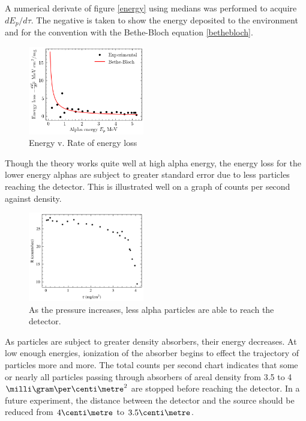 \documentclass[12pt]{article}
\begin{document}
\begin{multicols}{2}
    A numerical derivate of figure \ref{energy} using medians was performed to acquire $dE_p/d\tau$. The negative is taken to show the energy deposited to the environment and for the convention with the Bethe-Bloch equation \ref{bethebloch}. 

    \begin{figure}[H]
        \includegraphics[width=0.45\textwidth]{charts/EnergyLoss.png}
        \caption{Energy v. Rate of energy loss}
        \label{energyloss}
    \end{figure}

    Though the theory works quite well at high alpha energy, the energy loss for the lower energy alphas are subject to greater standard error due to less particles reaching the detector. This is illustrated well on a graph of counts per second against density.

    \begin{figure}[H]
        \includegraphics[width=0.45\textwidth]{charts/R.png}
        \caption{As the pressure increases, less alpha particles are able to reach the detector.}
        \label{R}
    \end{figure}

    As particles are subject to greater density absorbers, their energy decreases. At low enough energies, ionization of the absorber begins to effect the trajectory of particles more and more. The total counts per second chart indicates that some or nearly all particles passing through absorbers of areal density from 3.5 to 4 $\milli \gram \per \centi \metre^2$ are stopped before reaching the detector. In a future experiment, the distance between the detector and the source should be reduced from $4\centi \metre$ to $3.5 \centi \metre$.


\end{multicols}
\end{document}
